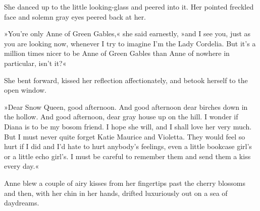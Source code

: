 She danced up to the little looking-glass and peered into it. Her pointed freckled face and solemn gray eyes peered back at her.

»You're only Anne of Green Gables,« she said earnestly, »and I see you, just as you are looking now, whenever I try to imagine I'm the Lady Cordelia. But it's a million times nicer to be Anne of Green Gables than Anne of nowhere in particular, isn't it?«

She bent forward, kissed her reflection affectionately, and betook herself to the open window.

»Dear Snow Queen, good afternoon. And good afternoon dear birches down in the hollow. And good afternoon, dear gray house up on the hill. I wonder if Diana is to be my bosom friend. I hope she will, and I shall love her very much. But I must never quite forget Katie Maurice and Violetta. They would feel so hurt if I did and I'd hate to hurt anybody's feelings, even a little bookcase girl's or a little echo girl's. I must be careful to remember them and send them a kiss every day.«

Anne blew a couple of airy kisses from her fingertips past the cherry blossoms and then, with her chin in her hands, drifted luxuriously out on a sea of daydreams.